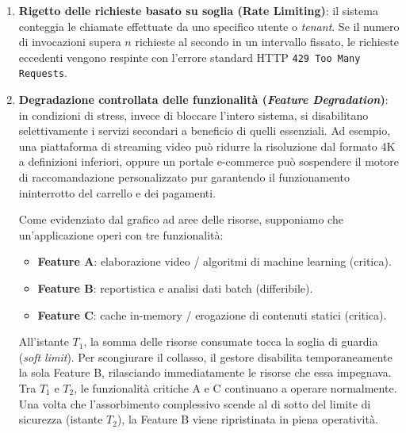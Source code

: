 \documentclass[11pt, a4paper]{article}
\begin{document}
\begin{enumerate}
    \item \textbf{Rigetto delle richieste basato su soglia (Rate Limiting)}: il sistema conteggia le chiamate effettuate da uno specifico utente o \emph{tenant}. Se il numero di invocazioni supera $n$ richieste al secondo in un intervallo fissato, le richieste eccedenti vengono respinte con l'errore standard HTTP \texttt{429 Too Many Requests}.


    \item \textbf{Degradazione controllata delle funzionalità (\emph{Feature Degradation})}: in condizioni di stress, invece di bloccare l'intero sistema, si disabilitano selettivamente i servizi secondari a beneficio di quelli essenziali. Ad esempio, una piattaforma di streaming video può ridurre la risoluzione dal formato 4K a definizioni inferiori, oppure un portale e-commerce può sospendere il motore di raccomandazione personalizzato pur garantendo il funzionamento ininterrotto del carrello e dei pagamenti.


    Come evidenziato dal grafico ad aree delle risorse, supponiamo che un'applicazione operi con tre funzionalità:
    \begin{itemize}[noitemsep]
        \item \textbf{Feature A}: elaborazione video / algoritmi di machine learning (critica).
        \item \textbf{Feature B}: reportistica e analisi dati batch (differibile).
        \item \textbf{Feature C}: cache in-memory / erogazione di contenuti statici (critica).
    \end{itemize}
    All'istante $T_1$, la somma delle risorse consumate tocca la soglia di guardia (\emph{soft limit}). Per scongiurare il collasso, il gestore disabilita temporaneamente la sola Feature B, rilasciando immediatamente le risorse che essa impegnava. Tra $T_1$ e $T_2$, le funzionalità critiche A e C continuano a operare normalmente. Una volta che l'assorbimento complessivo scende al di sotto del limite di sicurezza (istante $T_2$), la Feature B viene ripristinata in piena operatività.


\end{enumerate}
\end{document}
